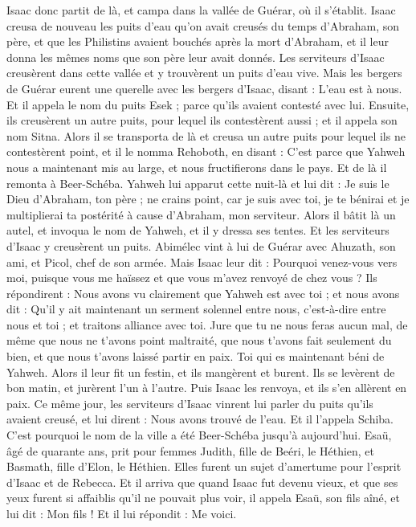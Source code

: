 \begin{multicols}{2}
Isaac donc partit de là, et campa dans la vallée de Guérar, où il s’établit.
Isaac creusa de nouveau les puits d'eau qu'on avait creusés du temps d'Abraham, son père, et que les Philistins avaient bouchés après la mort d'Abraham, et il leur donna les mêmes noms que son père leur avait donnés.
Les serviteurs d'Isaac creusèrent dans cette vallée et y trouvèrent un puits d'eau vive.
Mais les bergers de Guérar eurent une querelle avec les bergers d'Isaac, disant : L'eau est à nous. Et il appela le nom du puits Esek ; parce qu'ils avaient contesté avec lui.
Ensuite, ils creusèrent un autre puits, pour lequel ils contestèrent aussi ; et il appela son nom Sitna.
Alors il se transporta de là et creusa un autre puits pour lequel ils ne contestèrent point, et il le nomma Rehoboth, en disant : C'est parce que Yahweh nous a maintenant mis au large, et nous fructifierons dans le pays.
Et de là il remonta à Beer-Schéba.
Yahweh lui apparut cette nuit-là et lui dit : Je suis le Dieu d'Abraham, ton père ; ne crains point, car je suis avec toi, je te bénirai et je multiplierai ta postérité à cause d'Abraham, mon serviteur.
Alors il bâtit là un autel, et invoqua le nom de Yahweh, et il y dressa ses tentes. Et les serviteurs d'Isaac y creusèrent un puits.
Abimélec vint à lui de Guérar avec Ahuzath, son ami, et Picol, chef de son armée.
Mais Isaac leur dit : Pourquoi venez-vous vers moi, puisque vous me haïssez et que vous m'avez renvoyé de chez vous ?
Ils répondirent : Nous avons vu clairement que Yahweh est avec toi ; et nous avons dit : Qu'il y ait maintenant un serment solennel entre nous, c'est-à-dire entre nous et toi ; et traitons alliance avec toi.
Jure que tu ne nous feras aucun mal, de même que nous ne t'avons point maltraité, que nous t'avons fait seulement du bien, et que nous t’avons laissé partir en paix. Toi qui es maintenant béni de Yahweh.
Alors il leur fit un festin, et ils mangèrent et burent.
Ils se levèrent de bon matin, et jurèrent l'un à l'autre. Puis Isaac les renvoya, et ils s'en allèrent en paix.
Ce même jour, les serviteurs d'Isaac vinrent lui parler du puits qu'ils avaient creusé, et lui dirent : Nous avons trouvé de l'eau.
Et il l'appela Schiba. C'est pourquoi le nom de la ville a été Beer-Schéba jusqu'à aujourd'hui.
Esaü, âgé de quarante ans, prit pour femmes Judith, fille de Beéri, le Héthien, et Basmath, fille d'Elon, le Héthien.
Elles furent un sujet d’amertume pour l’esprit d’Isaac et de Rebecca.
\VerseOne{}Et il arriva que quand Isaac fut devenu vieux, et que ses yeux furent si affaiblis qu'il ne pouvait plus voir, il appela Esaü, son fils aîné, et lui dit : Mon fils ! Et il lui répondit : Me voici.

\end{multicols}
